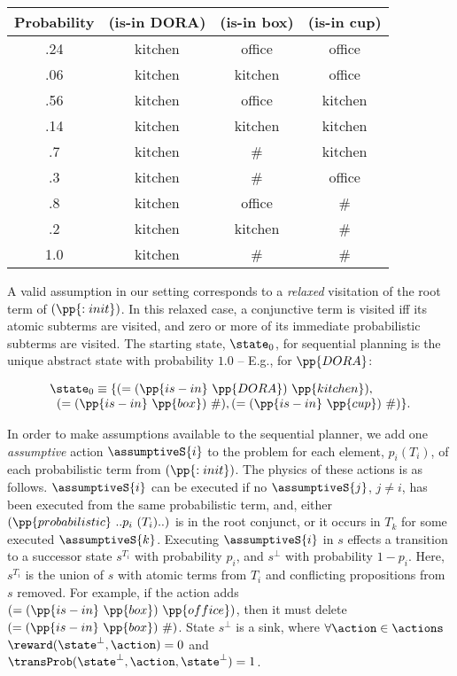 \small
\begin{tabular}{cccc}
\hline
Probability & (is-in DORA)  & (is-in box)  & (is-in cup) \\
\hline
.24 & kitchen & office & office \\
.06 & kitchen & kitchen & office \\
.56 & kitchen & office & kitchen \\
.14 & kitchen & kitchen & kitchen \\
.7 & kitchen & \# &  kitchen\\
.3 & kitchen & \# & office \\
.8 & kitchen & office & \# \\
.2 & kitchen & kitchen & \# \\
1.0 & kitchen & \# & \# \\
\hline
\end{tabular}
\normalsize

\noindent A valid assumption in our setting corresponds to a {\em
relaxed} visitation of the root term of $(\pp{:init})$. In this relaxed
case, a conjunctive term is visited iff its atomic subterms are
visited, and zero or more of its immediate probabilistic subterms are
visited. The starting state, $\state_0$, for sequential planning is
the unique abstract state with probability $1.0$ -- E.g., for
$\pp{DORA}$:

\[
\begin{array}{l}
\state_0 \equiv \{(=(\pp{is-in}~\pp{DORA})~\pp{kitchen}),\\
\;\;(=(\pp{is-in}~\pp{box})~\#), (=(\pp{is-in}~\pp{cup})~\#)\}.
\end{array}
\]

In order to make assumptions available to the sequential planner, we
add one {\em assumptive} action $\assumptiveS{i}$ to the problem for
each element, $p_i (T_i)$, of each probabilistic term from
$(\pp{:init})$. The physics of these actions is as
follows. $\assumptiveS{i}$ can be executed if no $\assumptiveS{j}$,
$j \neq i$, has been executed from the same probabilistic term, and,
either $(\pp{probabilistic}~..p_i~(T_i)..)$ is in the root conjunct,
or it occurs in $T_k$ for some executed $\assumptiveS{k}$.
Executing $\assumptiveS{i}$ in $s$ effects a transition to a successor
state $s^{T_i}$ with probability $p_i$, and $s^\bot$ with probability
$1 - p_i$. Here, $s^{T_i}$ is the union of $s$ with atomic terms from
$T_i$ and conflicting propositions from $s$ removed. For example, if
the action adds $(=(\pp{is-in}~\pp{box})~\pp{office})$, then it must
delete $(=(\pp{is-in}~\pp{box})~\#)$. State $s^\bot$ is a sink, where
$\forall\action\in\actions$ $\reward(\state^\bot, \action) = 0$ and
$\transProb(\state^\bot, \action, \state^\bot) = 1$.

